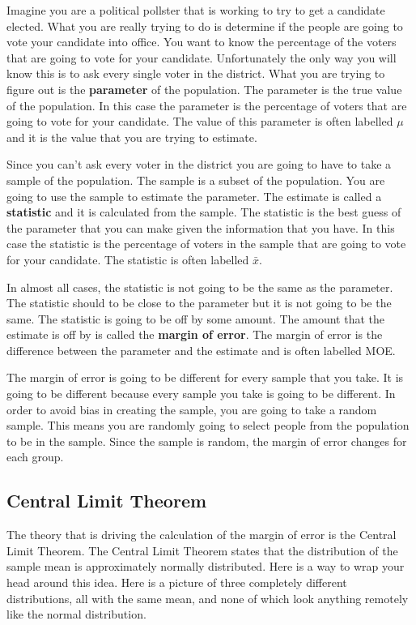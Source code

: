 \documentclass[
  letterpaper,
  DIV=11,
  numbers=noendperiod]{scrreprt}
\begin{document}
Imagine you are a political pollster that is working to try to get a
candidate elected. What you are really trying to do is determine if the
people are going to vote your candidate into office. You want to know
the percentage of the voters that are going to vote for your candidate.
Unfortunately the only way you will know this is to ask every single
voter in the district. What you are trying to figure out is the
\textbf{parameter} of the population. The parameter is the true value of
the population. In this case the parameter is the percentage of voters
that are going to vote for your candidate. The value of this parameter
is often labelled \(\mu\) and it is the value that you are trying to
estimate.

Since you can't ask every voter in the district you are going to have to
take a sample of the population. The sample is a subset of the
population. You are going to use the sample to estimate the parameter.
The estimate is called a \textbf{statistic} and it is calculated from
the sample. The statistic is the best guess of the parameter that you
can make given the information that you have. In this case the statistic
is the percentage of voters in the sample that are going to vote for
your candidate. The statistic is often labelled \(\bar{x}\).

In almost all cases, the statistic is not going to be the same as the
parameter. The statistic should to be close to the parameter but it is
not going to be the same. The statistic is going to be off by some
amount. The amount that the estimate is off by is called the
\textbf{margin of error}. The margin of error is the difference between
the parameter and the estimate and is often labelled MOE.

The margin of error is going to be different for every sample that you
take. It is going to be different because every sample you take is going
to be different. In order to avoid bias in creating the sample, you are
going to take a random sample. This means you are randomly going to
select people from the population to be in the sample. Since the sample
is random, the margin of error changes for each group.

\subsection*{Central Limit Theorem}\label{central-limit-theorem}

The theory that is driving the calculation of the margin of error is the
Central Limit Theorem. The Central Limit Theorem states that the
distribution of the sample mean is approximately normally distributed.
Here is a way to wrap your head around this idea. Here is a picture of
three completely different distributions, all with the same mean, and
none of which look anything remotely like the normal distribution.
\end{document}
